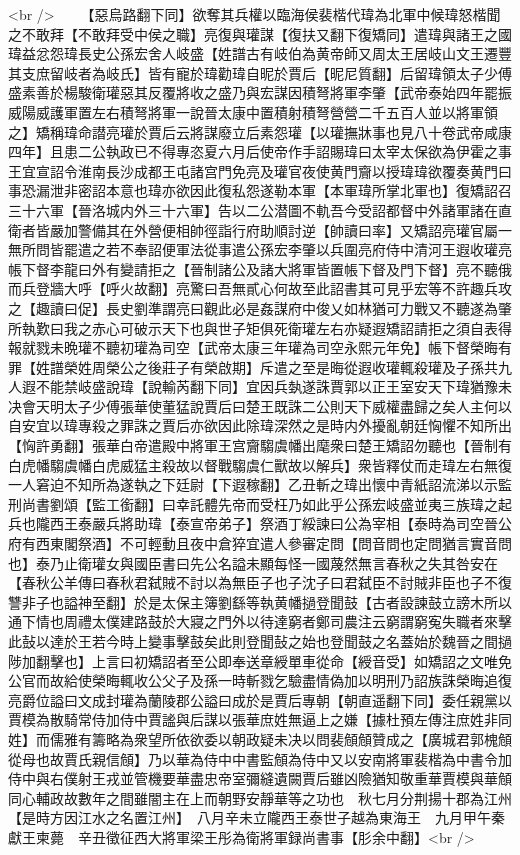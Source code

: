 <br />
　　【惡烏路翻下同】欲奪其兵權以臨海侯裴楷代瑋為北軍中候瑋怒楷聞之不敢拜【不敢拜受中侯之職】亮復與瓘謀【復扶又翻下復矯同】遣瑋與諸王之國瑋益忿怨瑋長史公孫宏舍人岐盛【姓譜古有岐伯為黄帝師又周太王居岐山文王遷豐其支庶留岐者為岐氏】皆有寵於瑋勸瑋自昵於賈后【昵尼質翻】后留瑋領太子少傅盛素善於楊駿衛瓘惡其反覆將收之盛乃與宏謀因積弩將軍李肇【武帝泰始四年罷振威陽威護軍置左右積弩將軍一說晉太康中置積射積弩營營二千五百人並以將軍領之】矯稱瑋命譛亮瓘於賈后云將謀廢立后素怨瓘【以瓘撫牀事也見八十卷武帝咸康四年】且患二公執政已不得專恣夏六月后使帝作手詔賜瑋曰太宰太保欲為伊霍之事王宜宣詔令淮南長沙成都王屯諸宫門免亮及瓘官夜使黄門齎以授瑋瑋欲覆奏黄門曰事恐漏泄非密詔本意也瑋亦欲因此復私怨遂勒本軍【本軍瑋所掌北軍也】復矯詔召三十六軍【晉洛城内外三十六軍】告以二公潜圖不軌吾今受詔都督中外諸軍諸在直衛者皆嚴加警備其在外營便相帥徑詣行府助順討逆【帥讀曰率】又矯詔亮瓘官屬一無所問皆罷遣之若不奉詔便軍法從事遣公孫宏李肇以兵圍亮府侍中清河王遐收瓘亮帳下督李龍曰外有變請拒之【晉制諸公及諸大將軍皆置帳下督及門下督】亮不聽俄而兵登牆大呼【呼火故翻】亮驚曰吾無貳心何故至此詔書其可見乎宏等不許趣兵攻之【趣讀曰促】長史劉準謂亮曰觀此必是姦謀府中俊乂如林猶可力戰又不聽遂為肇所執歎曰我之赤心可破示天下也與世子矩俱死衛瓘左右亦疑遐矯詔請拒之須自表得報就戮未晩瓘不聽初瓘為司空【武帝太康三年瓘為司空永熙元年免】帳下督榮晦有罪【姓譜榮姓周榮公之後莊子有榮啟期】斥遣之至是晦從遐收瓘輒殺瓘及子孫共九人遐不能禁岐盛說瑋【說輸芮翻下同】宜因兵埶遂誅賈郭以正王室安天下瑋猶豫未决會天明太子少傅張華使董猛說賈后曰楚王既誅二公則天下威權盡歸之矣人主何以自安宜以瑋專殺之罪誅之賈后亦欲因此除瑋深然之是時内外擾亂朝廷恟懼不知所出【恟許勇翻】張華白帝遣殿中將軍王宫齎騶虞幡出麾衆曰楚王矯詔勿聽也【晉制有白虎幡騶虞幡白虎威猛主殺故以督戰騶虞仁獸故以解兵】衆皆釋仗而走瑋左右無復一人窘迫不知所為遂執之下廷尉【下遐稼翻】乙丑斬之瑋出懷中青紙詔流涕以示監刑尚書劉頌【監工銜翻】曰幸託體先帝而受枉乃如此乎公孫宏岐盛並夷三族瑋之起兵也隴西王泰嚴兵將助瑋【泰宣帝弟子】祭酒丁綏諫曰公為宰相【泰時為司空晉公府有西東閣祭酒】不可輕動且夜中倉猝宜遣人參審定問【問音問也定問猶言實音問也】泰乃止衛瓘女與國臣書曰先公名謚未顯每怪一國蔑然無言春秋之失其咎安在【春秋公羊傳曰春秋君弑賊不討以為無臣子也子沈子曰君弑臣不討賊非臣也子不復讐非子也謚神至翻】於是太保主簿劉繇等執黄幡撾登聞鼓【古者設諫鼓立謗木所以通下情也周禮太僕建路鼓於大寢之門外以待達窮者鄭司農注云窮謂窮寃失職者來擊此鼔以達於王若今時上變事擊鼓矣此則登聞鼔之始也登聞鼓之名蓋始於魏晉之間撾陟加翻擊也】上言曰初矯詔者至公即奉送章綬單車從命【綬音受】如矯詔之文唯免公官而故給使榮晦輒收公父子及孫一時斬戮乞驗盡情偽加以明刑乃詔族誅榮晦追復亮爵位謚曰文成封瓘為蘭陵郡公謚曰成於是賈后專朝【朝直遥翻下同】委任親黨以賈模為散騎常侍加侍中賈謐與后謀以張華庶姓無逼上之嫌【據杜預左傳注庶姓非同姓】而儒雅有籌略為衆望所依欲委以朝政疑未决以問裴頠頠贊成之【廣城君郭槐頠從母也故賈氏親信頠】乃以華為侍中中書監頠為侍中又以安南將軍裴楷為中書令加侍中與右僕射王戎並管機要華盡忠帝室彌縫遺闕賈后雖凶險猶知敬重華賈模與華頠同心輔政故數年之間雖闇主在上而朝野安靜華等之功也　秋七月分荆揚十郡為江州【是時方因江水之名置江州】　八月辛未立隴西王泰世子越為東海王　九月甲午秦獻王柬薨　辛丑徵征西大將軍梁王彤為衛將軍録尚書事【肜余中翻】<br />
